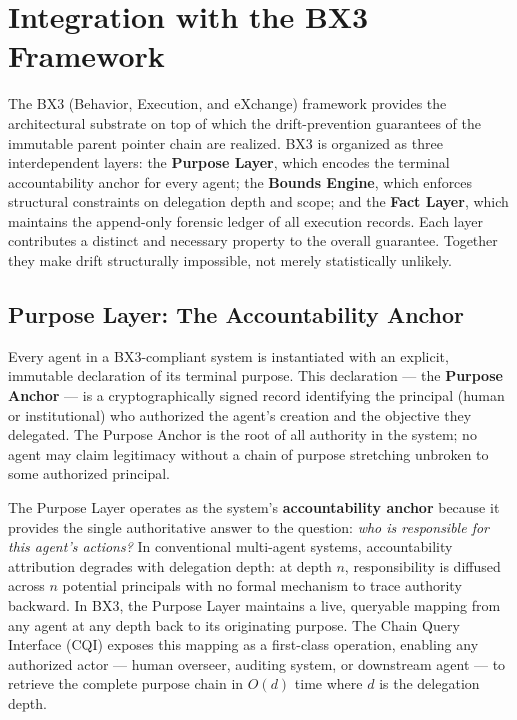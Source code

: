 
\section{Integration with the BX3 Framework}

The BX3 (Behavior, Execution, and eXchange) framework provides the architectural substrate on top of which the drift-prevention guarantees of the immutable parent pointer chain are realized. BX3 is organized as three interdependent layers: the \textbf{Purpose Layer}, which encodes the terminal accountability anchor for every agent; the \textbf{Bounds Engine}, which enforces structural constraints on delegation depth and scope; and the \textbf{Fact Layer}, which maintains the append-only forensic ledger of all execution records. Each layer contributes a distinct and necessary property to the overall guarantee. Together they make drift structurally impossible, not merely statistically unlikely.

\subsection{Purpose Layer: The Accountability Anchor}

Every agent in a BX3-compliant system is instantiated with an explicit, immutable declaration of its terminal purpose. This declaration — the \textbf{Purpose Anchor} — is a cryptographically signed record identifying the principal (human or institutional) who authorized the agent's creation and the objective they delegated. The Purpose Anchor is the root of all authority in the system; no agent may claim legitimacy without a chain of purpose stretching unbroken to some authorized principal.

The Purpose Layer operates as the system's \textbf{accountability anchor} because it provides the single authoritative answer to the question: \emph{who is responsible for this agent's actions?} In conventional multi-agent systems, accountability attribution degrades with delegation depth: at depth $n$, responsibility is diffused across $n$ potential principals with no formal mechanism to trace authority backward. In BX3, the Purpose Layer maintains a live, queryable mapping from any agent at any depth back to its originating purpose. The Chain Query Interface (CQI) exposes this mapping as a first-class operation, enabling any authorized actor — human overseer, auditing system, or downstream agent — to retrieve the complete purpose chain in $O(d)$ time where $d$ is the delegation depth.

